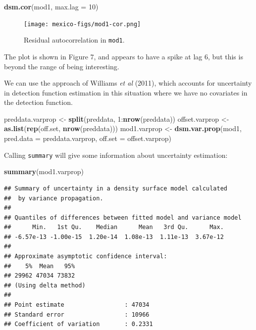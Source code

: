 \documentclass[]{amsart}
\newenvironment{Shaded}{}{}
\newcommand{\KeywordTok}[1]{\textcolor[rgb]{0.00,0.44,0.13}{\textbf{{#1}}}}
\newcommand{\DataTypeTok}[1]{\textcolor[rgb]{0.56,0.13,0.00}{{#1}}}
\newcommand{\DecValTok}[1]{\textcolor[rgb]{0.25,0.63,0.44}{{#1}}}
\newcommand{\StringTok}[1]{\textcolor[rgb]{0.25,0.44,0.63}{{#1}}}
\newcommand{\NormalTok}[1]{{#1}}
\begin{document}
\begin{Shaded}
\begin{Highlighting}[]
\KeywordTok{dsm.cor}\NormalTok{(mod1, }\DataTypeTok{max.lag =} \DecValTok{10}\NormalTok{)}
\end{Highlighting}
\end{Shaded}

\begin{figure}[htbp]
\centering
\texttt{[image: mexico-figs/mod1-cor.png]}
\caption{Residual autocorrelation in \texttt{mod1}.}
\end{figure}

The plot is shown in Figure 7, and appears to have a spike at lag 6, but
this is beyond the range of being interesting.

We can use the approach of Williams \emph{et al} (2011), which accounts
for uncertainty in detection function estimation in this situation where
we have no covariates in the detection function.

\begin{Shaded}
\begin{Highlighting}[]
\NormalTok{preddata.varprop <-}\StringTok{ }\KeywordTok{split}\NormalTok{(preddata, }\DecValTok{1}\NormalTok{:}\KeywordTok{nrow}\NormalTok{(preddata))}
\NormalTok{offset.varprop <-}\StringTok{ }\KeywordTok{as.list}\NormalTok{(}\KeywordTok{rep}\NormalTok{(off.set, }\KeywordTok{nrow}\NormalTok{(preddata)))}
\NormalTok{mod1.varprop <-}\StringTok{ }\KeywordTok{dsm.var.prop}\NormalTok{(mod1, }\DataTypeTok{pred.data =} \NormalTok{preddata.varprop, }
	\DataTypeTok{off.set =} \NormalTok{offset.varprop)}
\end{Highlighting}
\end{Shaded}

Calling \texttt{summary} will give some information about uncertainty
estimation:

\begin{Shaded}
\begin{Highlighting}[]
\KeywordTok{summary}\NormalTok{(mod1.varprop)}
\end{Highlighting}
\end{Shaded}

\begin{verbatim}
## Summary of uncertainty in a density surface model calculated
##  by variance propagation.
## 
## Quantiles of differences between fitted model and variance model
##      Min.   1st Qu.    Median      Mean   3rd Qu.      Max. 
## -6.57e-13 -1.00e-15  1.20e-14  1.08e-13  1.11e-13  3.67e-12 
## 
## Approximate asymptotic confidence interval:
##    5%  Mean   95% 
## 29962 47034 73832 
## (Using delta method)
## 
## Point estimate                 : 47034 
## Standard error                 : 10966 
## Coefficient of variation       : 0.2331
\end{verbatim}
\end{document}
